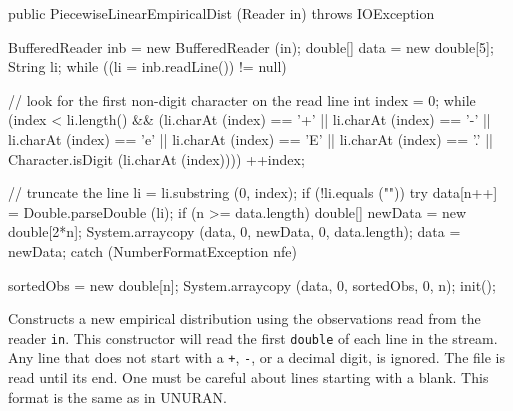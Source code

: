 \begin{code}

   public PiecewiseLinearEmpiricalDist (Reader in) throws IOException\begin{hide} {
      BufferedReader inb = new BufferedReader (in);
      double[] data = new double[5];
      String li;
      while ((li = inb.readLine()) != null) {
         // look for the first non-digit character on the read line
         int index = 0;
         while (index < li.length() &&
            (li.charAt (index) == '+' || li.charAt (index) == '-' ||
             li.charAt (index) == 'e' || li.charAt (index) == 'E' ||
             li.charAt (index) == '.' || Character.isDigit (li.charAt (index))))
           ++index; 

         // truncate the line
         li = li.substring (0, index);
         if (!li.equals ("")) {
            try {
               data[n++] = Double.parseDouble (li);
               if (n >= data.length) {
                  double[] newData = new double[2*n];
                  System.arraycopy (data, 0, newData, 0, data.length);
                  data = newData;
               }
            }
            catch (NumberFormatException nfe) {}
         }
      }
      sortedObs = new double[n];
      System.arraycopy (data, 0, sortedObs, 0, n);
      init();
   }\end{hide}
\end{code}
\begin{tabb}   Constructs a new empirical distribution using
  the observations read from the reader \texttt{in}. This constructor
  will read the first \texttt{double} of each line in the stream.
  Any line that does not start with a \texttt{+}, \texttt{-}, or a decimal digit,
  is ignored.  The file is read until its end.
  One must be careful about lines starting with a blank.
  This format is the same as in UNURAN.
\end{tabb}
